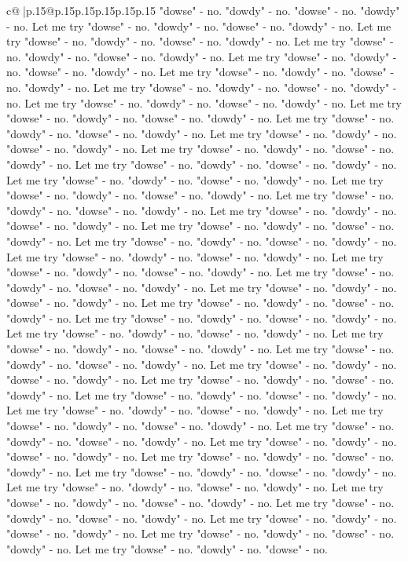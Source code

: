 \documentclass{article}
\begin{document}
{\begin{supertabular}{c@{$\;$}|p{.15\linewidth}@{}p{.15\linewidth}p{.15\linewidth}p{.15\linewidth}p{.15\linewidth}p{.15\linewidth}}
{{{"dowse" {-} no. "dowdy" {-} no. "dowse" {-} no. "dowdy" {-} no. Let me try "dowse" {-} no. "dowdy" {-} no. "dowse" {-} no. "dowdy" {-} no. Let me try "dowse" {-} no. "dowdy" {-} no. "dowse" {-} no. "dowdy" {-} no. Let me try "dowse" {-} no. "dowdy" {-} no. "dowse" {-} no. "dowdy" {-} no. Let me try "dowse" {-} no. "dowdy" {-} no. "dowse" {-} no. "dowdy" {-} no. Let me try "dowse" {-} no. "dowdy" {-} no. "dowse" {-} no. "dowdy" {-} no. Let me try "dowse" {-} no. "dowdy" {-} no. "dowse" {-} no. "dowdy" {-} no. Let me try "dowse" {-} no. "dowdy" {-} no. "dowse" {-} no. "dowdy" {-} no. Let me try "dowse" {-} no. "dowdy" {-} no. "dowse" {-} no. "dowdy" {-} no. Let me try "dowse" {-} no. "dowdy" {-} no. "dowse" {-} no. "dowdy" {-} no. Let me try "dowse" {-} no. "dowdy" {-} no. "dowse" {-} no. "dowdy" {-} no. Let me try "dowse" {-} no. "dowdy" {-} no. "dowse" {-} no. "dowdy" {-} no. Let me try "dowse" {-} no. "dowdy" {-} no. "dowse" {-} no. "dowdy" {-} no. Let me try "dowse" {-} no. "dowdy" {-} no. "dowse" {-} no. "dowdy" {-} no. Let me try "dowse" {-} no. "dowdy" {-} no. "dowse" {-} no. "dowdy" {-} no. Let me try "dowse" {-} no. "dowdy" {-} no. "dowse" {-} no. "dowdy" {-} no. Let me try "dowse" {-} no. "dowdy" {-} no. "dowse" {-} no. "dowdy" {-} no. Let me try "dowse" {-} no. "dowdy" {-} no. "dowse" {-} no. "dowdy" {-} no. Let me try "dowse" {-} no. "dowdy" {-} no. "dowse" {-} no. "dowdy" {-} no. Let me try "dowse" {-} no. "dowdy" {-} no. "dowse" {-} no. "dowdy" {-} no. Let me try "dowse" {-} no. "dowdy" {-} no. "dowse" {-} no. "dowdy" {-} no. Let me try "dowse" {-} no. "dowdy" {-} no. "dowse" {-} no. "dowdy" {-} no. Let me try "dowse" {-} no. "dowdy" {-} no. "dowse" {-} no. "dowdy" {-} no. Let me try "dowse" {-} no. "dowdy" {-} no. "dowse" {-} no. "dowdy" {-} no. Let me try "dowse" {-} no. "dowdy" {-} no. "dowse" {-} no. "dowdy" {-} no. Let me try "dowse" {-} no. "dowdy" {-} no. "dowse" {-} no. "dowdy" {-} no. Let me try "dowse" {-} no. "dowdy" {-} no. "dowse" {-} no. "dowdy" {-} no. Let me try "dowse" {-} no. "dowdy" {-} no. "dowse" {-} no. "dowdy" {-} no. Let me try "dowse" {-} no. "dowdy" {-} no. "dowse" {-} no. "dowdy" {-} no. Let me try "dowse" {-} no. "dowdy" {-} no. "dowse" {-} no. "dowdy" {-} no. Let me try "dowse" {-} no. "dowdy" {-} no. "dowse" {-} no. "dowdy" {-} no. Let me try "dowse" {-} no. "dowdy" {-} no. "dowse" {-} no. "dowdy" {-} no. Let me try "dowse" {-} no. "dowdy" {-} no. "dowse" {-} no. "dowdy" {-} no. Let me try "dowse" {-} no. "dowdy" {-} no. "dowse" {-} no. "dowdy" {-} no. Let me try "dowse" {-} no. "dowdy" {-} no. "dowse" {-} no. "dowdy" {-} no. Let me try "dowse" {-} no. "dowdy" {-} no. "dowse" {-} no. "dowdy" {-} no. Let me try "dowse" {-} no. "dowdy" {-} no. "dowse" {-} no. "dowdy" {-} no. Let me try "dowse" {-} no. "dowdy" {-} no. "dowse" {-} no. "dowdy" {-} no. Let me try "dowse" {-} no. "dowdy" {-} no. "dowse" {-} no. "dowdy" {-} no. Let me try "dowse" {-} no. "dowdy" {-} no. "dowse" {-} no. "dowdy" {-} no. Let me try "dowse" {-} no. "dowdy" {-} no. "dowse" {-} no. "dowdy" {-} no. Let me try "dowse" {-} no. "dowdy" {-} no. "dowse" {-} no. "dowdy" {-} no. Let me try "dowse" {-} no. "dowdy" {-} no. "dowse" {-} no. }}}
\end{supertabular}}
\end{document}
